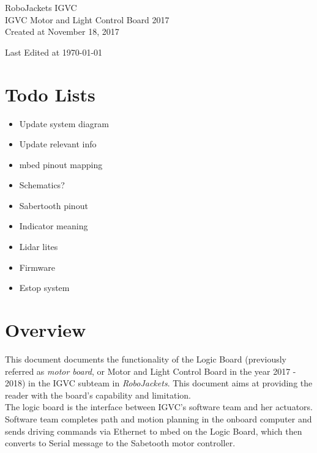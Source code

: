 \documentclass[letterpaper, 12pt]{article}
\begin{document}
\begin{titlepage}
\centering
	{\LARGE RoboJackets IGVC}\\
	\vspace{1cm}
	{\Large IGVC Motor and Light Control Board 2017}\\
	\vfill
	{\large Created at November 18, 2017}\\
	\vspace{1cm}
	{\large Last Edited at \today\par}
\end{titlepage}

\tableofcontents

\pagebreak
\section*{Todo Lists}
\begin{itemize}
  \item Update system diagram
  \item Update relevant info
  \item mbed pinout mapping
  \item Schematics?
  \item Sabertooth pinout
  \item Indicator meaning
  \item Lidar lites
  \item Firmware
  \item Estop system
\end{itemize}

\pagebreak

\section{Overview}
This document documents the functionality of the Logic Board (previously referred as \emph{motor board},
or Motor and Light Control Board in the year 2017 - 2018) in the IGVC subteam in \emph{RoboJackets}.
This document aims at providing the reader with the board's capability and limitation. \vspace{6pt}\\
The logic board is the interface between IGVC's software team and her actuators. Software team completes
path and motion planning in the onboard computer and sends driving commands via Ethernet to mbed on the Logic
Board, which then converts to Serial message to the Sabetooth motor controller.\\

\end{document}
